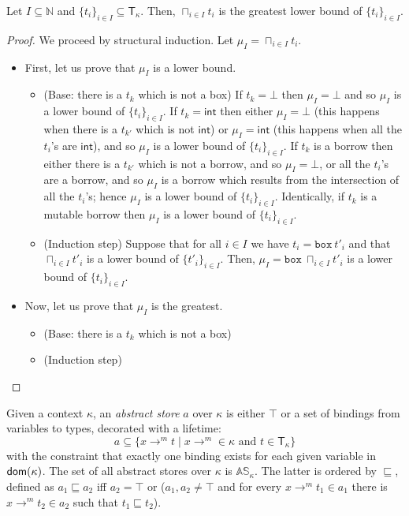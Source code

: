 \begin{lemma}\label{lemma:glb-type}
  Let $I\subseteq\mathbb{N}$ and $\{t_i\}_{i\in I}\subseteq\mathsf{T}_\kappa$.
  Then, $\sqcap_{i\in I}t_i$ is the greatest lower bound of $\{t_i\}_{i\in I}$.
\end{lemma}
\begin{proof}
  We proceed by structural induction.
  Let $\mu_I = \sqcap_{i\in I}t_i$.
  \begin{itemize}
    \item First, let us prove that $\mu_I$ is a lower bound.
    \begin{itemize}
      \item (Base: there is a $t_k$ which is not a box)
      If $t_k=\bot$ then $\mu_I=\bot$ and so $\mu_I$ is a lower bound of
      $\{t_i\}_{i\in I}$.
      If $t_k=\mathsf{int}$ then either $\mu_I=\bot$ (this happens when
      there is a $t_{k'}$ which is not $\mathsf{int}$) or $\mu_I=\mathsf{int}$
      (this happens when all the $t_i$'s are $\mathsf{int}$), and so
      $\mu_I$ is a lower bound of $\{t_i\}_{i\in I}$.
      If $t_k$ is a borrow then either there is a $t_{k'}$ which is not a borrow,
      and so $\mu_I=\bot$, or all the $t_i$'s are a borrow, and so $\mu_I$ is
      a borrow which results from the intersection of all the $t_i$'s; hence
      $\mu_I$ is a lower bound of $\{t_i\}_{i\in I}$.
      Identically, if $t_k$ is a mutable borrow then $\mu_I$ is a lower bound
      of $\{t_i\}_{i\in I}$.
      \item (Induction step) Suppose that for all $i\in I$ we have
      $t_i = \mathtt{box}\ t'_i$ and that $\sqcap_{i\in I}t'_i$ is a lower
      bound of $\{t'_i\}_{i\in I}$. Then,
      $\mu_I = \mathtt{box}\ \sqcap_{i\in I}t'_i$ is a lower bound
      of $\{t_i\}_{i\in I}$.
    \end{itemize}
    \item Now, let us prove that $\mu_I$ is the greatest.
    \begin{itemize}
      \item (Base: there is a $t_k$ which is not a box)
      \item (Induction step)
    \end{itemize}
  \end{itemize}
\end{proof}

\begin{definition}
  \label{def:abstract-store}
  Given a context $\kappa$, an \emph{abstract store} $a$ over $\kappa$ is either $\top$
  or a set of bindings from variables to types, decorated with a lifetime:
  \[
  a\subseteq\{x\to^m t\mid x\to^m\in\kappa\text{ and }t\in\mathsf{T_\kappa}\}
  \]
  with the constraint that exactly one binding exists for each given variable in $\mathsf{dom}(\kappa)$.
  The set of all abstract stores over $\kappa$ is $\mathbb{AS}_\kappa$.
  The latter is ordered by $\sqsubseteq$, defined as $a_1\sqsubseteq a_2$ iff $a_2=\top$ or
  ($a_1,a_2\not=\top$ and for every $x\to^mt_1\in a_1$ there is $x\to^mt_2\in a_2$
  such that $t_1\sqsubseteq t_2$).
\end{definition}

